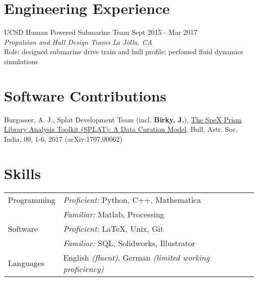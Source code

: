 \documentclass[margin,line]{resume}
\begin{document}
\begin{resume}

\section{\mysidestyle \textcolor{bcolor}{Engineering Experience}}
UCSD Human Powered Submarine Team \hfill Sept 2015 - Mar 2017 \\
\-\hspace{.25cm} \textit{Propulsion and Hull Design Teams \hfill La Jolla, CA}  \\
\-\hspace{.25cm} Role: designed submarine drive train and hull profile; perfomed fluid dynamics simulations


\section{\mysidestyle \textcolor{bcolor}{Software Contributions}}
Burgasser, A. J., Splat Development Team (incl. \textbf{Birky, J.}), \href{https://arxiv.org/abs/1707.00062}{The SpeX Prism Library Analysis Toolkit (SPLAT): A Data Curation Model}, Bull. Astr. Soc. India, 00, 1-6, 2017 (arXiv:1707.00062)


\section{\mysidestyle \textcolor{bcolor}{Skills}} 

\noindent\begin{tabular}{@{}l|l}
  \multirow{1}{*}{{\sc Programming}} & \textit{Proficient:} Python, C++, Mathematica \\
  	& \textit{Familiar:} Matlab, Processing \vspace{.1cm} \\
  \multirow{1}{*}{{\sc Software}} & \textit{Proficient:} \LaTeX, Unix, Git \\
  	& \textit{Familiar:} SQL, Solidworks, Illustrator  \vspace{.1cm} \\
  \multirow{1}{*}{{\sc Languages}} & English \textit{(fluent)}, German \textit{(limited working proficiency)}
\end{tabular}


\end{resume}
\end{document}
